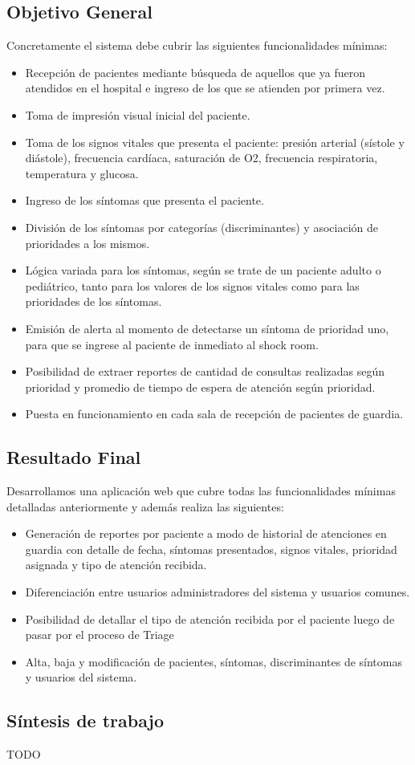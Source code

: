 \subsection{Objetivo General}
Concretamente el sistema debe cubrir las siguientes funcionalidades mínimas:
\begin{itemize}
\item Recepción de pacientes mediante búsqueda de aquellos que ya fueron atendidos en el hospital e ingreso de los que se atienden por primera vez.
\item Toma de impresión visual inicial del paciente.
\item Toma de los signos vitales que presenta el paciente: presión arterial (sístole y diástole), frecuencia cardíaca, saturación de O2, frecuencia respiratoria, temperatura y glucosa.
\item Ingreso de los síntomas que presenta el paciente.
\item División de los síntomas por categorías (discriminantes) y asociación de prioridades a los mismos.
\item Lógica variada para los síntomas, según se trate de un paciente adulto o pediátrico, tanto para los valores de los signos vitales como para las prioridades de los síntomas.
\item Emisión de alerta al momento de detectarse un síntoma de prioridad uno, para que se ingrese al paciente de inmediato al shock room.
\item Posibilidad de extraer reportes de cantidad de consultas realizadas según prioridad y promedio de tiempo de espera de atención según prioridad.
\item Puesta en funcionamiento en cada sala de recepción de pacientes de guardia.
\end{itemize}
\subsection{Resultado Final}
Desarrollamos una aplicación web que cubre todas las funcionalidades mínimas detalladas anteriormente y además realiza las siguientes:
\begin{itemize}
\item Generación de reportes por paciente a modo de historial de atenciones en guardia con detalle de fecha, síntomas presentados, signos vitales, prioridad asignada y tipo de atención recibida.
\item Diferenciación entre usuarios administradores del sistema y usuarios comunes.
\item Posibilidad de detallar el tipo de atención recibida por el paciente luego de pasar por el proceso de Triage
\item Alta, baja y modificación de pacientes, síntomas, discriminantes de síntomas y usuarios del sistema.
\end{itemize}
\subsection{Síntesis de trabajo}
TODO